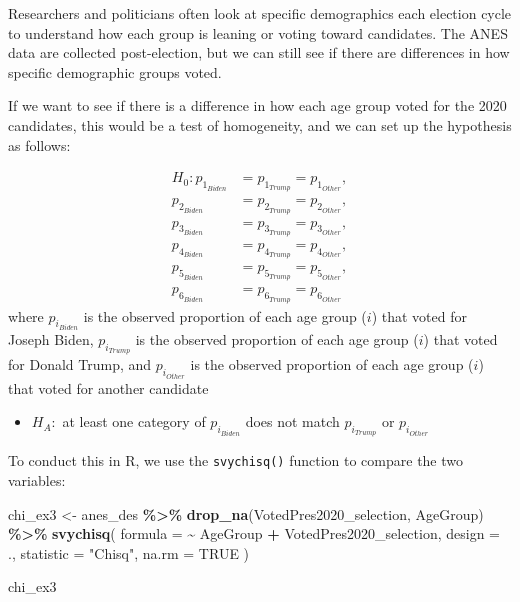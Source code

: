 \documentclass[
]{krantz}
\makeatletter
\newenvironment{Shaded}{\begin{snugshade}}{\end{snugshade}}
\newcommand{\AttributeTok}[1]{\textcolor[rgb]{0.27,0.27,0.27}{#1}}
\newcommand{\ConstantTok}[1]{\textcolor[rgb]{0.37,0.37,0.37}{#1}}
\newcommand{\FunctionTok}[1]{\textcolor[rgb]{0.27,0.27,0.27}{\textbf{#1}}}
\newcommand{\NormalTok}[1]{#1}
\newcommand{\OtherTok}[1]{\textcolor[rgb]{0.37,0.37,0.37}{#1}}
\newcommand{\SpecialCharTok}[1]{\textcolor[rgb]{0.43,0.43,0.43}{\textbf{#1}}}
\newcommand{\StringTok}[1]{\textcolor[rgb]{0.5,0.5,0.5}{#1}}
\providecommand{\tightlist}{%
  \setlength{\itemsep}{0pt}\setlength{\parskip}{0pt}}
\newenvironment{kframe}{%
\medskip{}
\setlength{\fboxsep}{.8em}
 \def\at@end@of@kframe{}%
 \ifinner\ifhmode%
  \def\at@end@of@kframe{\end{minipage}}%
  \begin{minipage}{\columnwidth}%
 \fi\fi%
 \def\FrameCommand##1{\hskip\@totalleftmargin \hskip-\fboxsep
 \colorbox{shadecolor}{##1}\hskip-\fboxsep
     \hskip-\linewidth \hskip-\@totalleftmargin \hskip\columnwidth}%
 \MakeFramed {\advance\hsize-\width
   \@totalleftmargin\z@ \linewidth\hsize
   \@setminipage}}%
 {\par\unskip\endMakeFramed%
 \at@end@of@kframe}
\renewenvironment{Shaded}{\begin{kframe}}{\end{kframe}}
\makeatother
\begin{document}
Researchers and politicians often look at specific demographics each election cycle to understand how each group is leaning or voting toward candidates. The ANES data are collected post-election, but we can still see if there are differences in how specific demographic groups voted.

If we want to see if there is a difference in how each age group voted for the 2020 candidates, this would be a test of homogeneity, and we can set up the hypothesis as follows:

\begin{align*}
H_0: p_{1_{Biden}} &= p_{1_{Trump}} = p_{1_{Other}},\\
    p_{2_{Biden}} &= p_{2_{Trump}} = p_{2_{Other}},\\
    p_{3_{Biden}} &= p_{3_{Trump}} = p_{3_{Other}},\\
    p_{4_{Biden}} &= p_{4_{Trump}} = p_{4_{Other}},\\
    p_{5_{Biden}} &= p_{5_{Trump}} = p_{5_{Other}},\\
    p_{6_{Biden}} &= p_{6_{Trump}} = p_{6_{Other}}
  \end{align*}
where \(p_{i_{Biden}}\) is the observed proportion of each age group (\(i\)) that voted for Joseph Biden, \(p_{i_{Trump}}\) is the observed proportion of each age group (\(i\)) that voted for Donald Trump, and \(p_{i_{Other}}\) is the observed proportion of each age group (\(i\)) that voted for another candidate

\begin{itemize}
\tightlist
\item
  \(H_A:\) at least one category of \(p_{i_{Biden}}\) does not match \(p_{i_{Trump}}\) or \(p_{i_{Other}}\)
\end{itemize}

To conduct this in R, we use the \texttt{svychisq()} function to compare the two variables:

\begin{Shaded}
\begin{Highlighting}[]
\NormalTok{chi\_ex3 }\OtherTok{\textless{}{-}}\NormalTok{ anes\_des }\SpecialCharTok{\%\textgreater{}\%}
  \FunctionTok{drop\_na}\NormalTok{(VotedPres2020\_selection, AgeGroup) }\SpecialCharTok{\%\textgreater{}\%}
  \FunctionTok{svychisq}\NormalTok{(}
    \AttributeTok{formula =} \SpecialCharTok{\textasciitilde{}}\NormalTok{ AgeGroup }\SpecialCharTok{+}\NormalTok{ VotedPres2020\_selection,}
    \AttributeTok{design =}\NormalTok{ .,}
    \AttributeTok{statistic =} \StringTok{"Chisq"}\NormalTok{,}
    \AttributeTok{na.rm =} \ConstantTok{TRUE}
\NormalTok{  )}

\NormalTok{chi\_ex3}
\end{Highlighting}
\end{Shaded}
\end{document}
